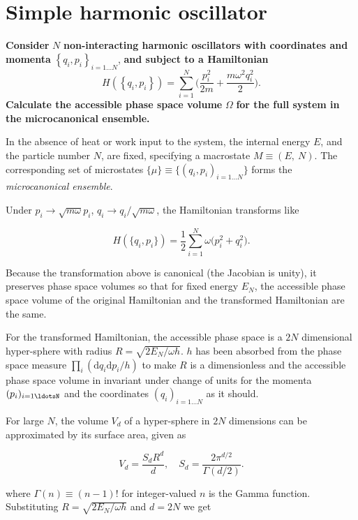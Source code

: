 \documentclass[11pt]{article}
\begin{document}
\section*{Simple harmonic oscillator}
\label{sec:orgfca07f5}

\textbf{Consider} \(N\) \textbf{non-interacting harmonic oscillators with coordinates and momenta} \(\left\{q_i, p_i\right\}_{i=1\ldots N}\), \textbf{and subject to a Hamiltonian}
\[
H \left(\left\{q_i, p_i\right\}\right)=\sum_{i=1}^N \bigg(\frac{p_i^2}{2 m}+\frac{m \omega^2 q_i^2}{2}\bigg).
\]
\label{sec:orgd37bd42}
\textbf{Calculate the accessible phase space volume} \(\Omega\) \textbf{for the full system in the microcanonical ensemble.}


In the absence of heat or work input to the system, the internal energy \(E\), and the particle number \(N\), are fixed, specifying a macrostate \(M \equiv(E,~N)\). The corresponding set of microstates \(\{\mu\} \equiv \big\{ (q_i, p_i)_{i=1\ldots N}\big \}\) forms the \emph{microcanonical ensemble}.

Under \(p_i \rightarrow \sqrt{m\omega} p_i\), \(q_i \rightarrow q_i/ \sqrt{m\omega}\), the Hamiltonian transforms like

\[
H(\{q_i, p_i\}) = \frac{1}{2} \sum_{i=1}^{N} \omega \big( p_i^2 + q_i^2 \big).
\]

Because the transformation above is canonical (the Jacobian is unity), it preserves phase space volumes so that for fixed energy \(E_{N}\), the accessible phase space volume of the original Hamiltonian and the transformed Hamiltonian are the same. 

For the transformed Hamiltonian, the accessible phase space is a \(2N\) dimensional hyper-sphere with radius \(R = \sqrt{2E_{N}/\omega h}\). \(h\) has been absorbed from the phase space measure \(\prod_{i} (\mathrm{d} q_i \mathrm{d} p_i / h)\) to make \(R\) is a dimensionless and the accessible phase space volume in invariant under change of units for the momenta \((p_{i})_{i=1\ldotsN}\) and the coordinates \((q_{i})_{i=1\ldots N}\) as it should.

For large \(N\), the volume \(V_d\) of a hyper-sphere in \(2N\) dimensions can be approximated by its surface area, given as

\[
V_{d} = \frac{S_{d} R^{d}}{d}, \quad S_{d} = \frac{2 \pi^{d / 2}}{\Gamma (d / 2)}.
\]

where \(\Gamma (n) \equiv (n-1)!\) for integer-valued \(n\) is the Gamma function. Substituting \(R = \sqrt{2E_{N}/\omega h}\) and \(d = 2N\) we get
\end{document}
